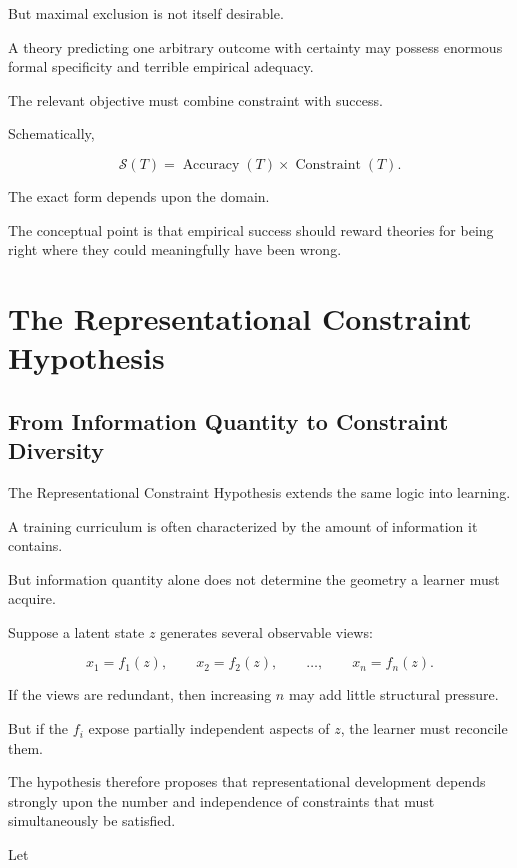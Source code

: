 \documentclass[11pt]{article}
\theoremstyle{remark}
\begin{document}
But maximal exclusion is not itself desirable.

A theory predicting one arbitrary outcome with certainty may possess enormous formal specificity and terrible empirical adequacy.

The relevant objective must combine constraint with success.

Schematically,

\begin{equation}
\mathcal{S}(T)
=
\operatorname{Accuracy}(T)
\times
\operatorname{Constraint}(T).
\end{equation}

The exact form depends upon the domain.

The conceptual point is that empirical success should reward theories for being right where they could meaningfully have been wrong.

\section{The Representational Constraint Hypothesis}

\subsection{From Information Quantity to Constraint Diversity}

The Representational Constraint Hypothesis extends the same logic into learning.

A training curriculum is often characterized by the amount of information it contains.

But information quantity alone does not determine the geometry a learner must acquire.

Suppose a latent state $z$ generates several observable views:

\begin{equation}
x_1=f_1(z),
\qquad
x_2=f_2(z),
\qquad
\ldots,
\qquad
x_n=f_n(z).
\end{equation}

If the views are redundant, then increasing $n$ may add little structural pressure.

But if the $f_i$ expose partially independent aspects of $z$, the learner must reconcile them.

The hypothesis therefore proposes that representational development depends strongly upon the number and independence of constraints that must simultaneously be satisfied.

Let
\end{document}
